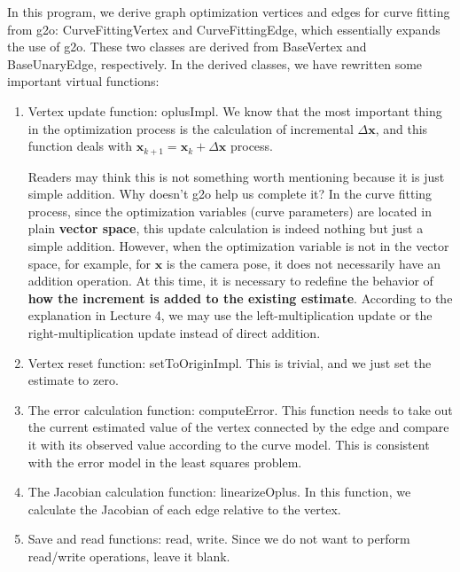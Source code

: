 In this program, we derive graph optimization vertices and edges for curve fitting from g2o: CurveFittingVertex and CurveFittingEdge, which essentially expands the use of g2o. These two classes are derived from BaseVertex and BaseUnaryEdge, respectively. In the derived classes, we have rewritten some important virtual functions:
\begin{enumerate}
    \item Vertex update function: oplusImpl. We know that the most important thing in the optimization process is the calculation of incremental $\Delta \mathbf{x}$, and this function deals with $\mathbf{x}_{k+1} = \mathbf{x}_k + \Delta \mathbf{x}$ process.

    Readers may think this is not something worth mentioning because it is just simple addition. Why doesn't g2o help us complete it? In the curve fitting process, since the optimization variables (curve parameters) are located in plain \textbf{vector space}, this update calculation is indeed nothing but just a simple addition. However, when the optimization variable is not in the vector space, for example, for $\mathbf{x}$ is the camera pose, it does not necessarily have an addition operation. At this time, it is necessary to redefine the behavior of \textbf{how the increment is added to the existing estimate}. According to the explanation in Lecture 4, we may use the left-multiplication update or the right-multiplication update instead of direct addition.

    \item Vertex reset function: setToOriginImpl. This is trivial, and we just set the estimate to zero.

    \item The error calculation function: computeError. This function needs to take out the current estimated value of the vertex connected by the edge and compare it with its observed value according to the curve model. This is consistent with the error model in the least squares problem.
    
    \item The Jacobian calculation function: linearizeOplus. In this function, we calculate the Jacobian of each edge relative to the vertex.

    \item Save and read functions: read, write. Since we do not want to perform read/write operations, leave it blank.
\end{enumerate}

